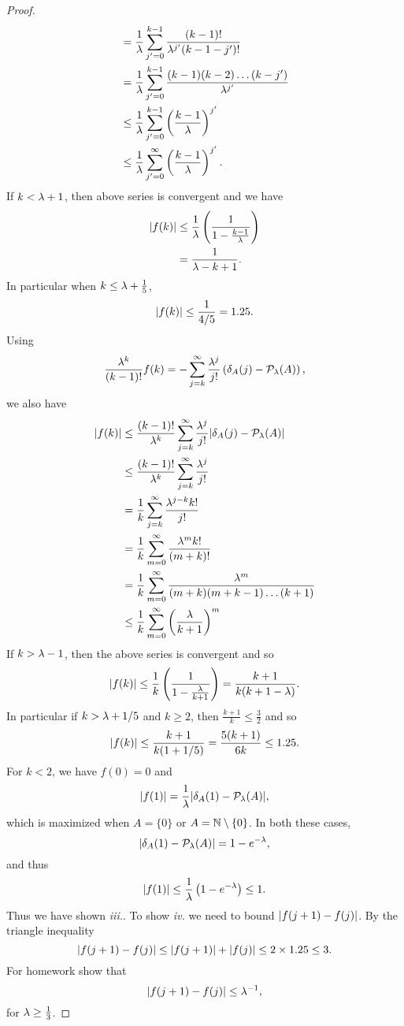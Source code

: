 \begin{proof}
\begin{align*}
        &=\frac{1}{\lambda}\sum_{j'=0}^{k-1} \frac{(k-1)!}{\lambda^{j'}(k-1-j')!}\\
        &=\frac{1}{\lambda}\sum_{j'=0}^{k-1} \frac{(k-1)(k-2)\ldots(k-j')}{\lambda^{j'}}\\
        &\le \frac{1}{\lambda}\sum_{j'=0}^{k-1}\left(\frac{k-1}{\lambda}\right)^{j'}\\
        &\le \frac{1}{\lambda}\sum_{j'=0}^{\infty}\left(\frac{k-1}{\lambda}\right)^{j'}.
    \end{align*}
    If $k < \lambda+1$, then above series is convergent and we have 
    \begin{align*}
        {\left\lvert f(k)\right\rvert}&\le\frac{1}{\lambda}\left(\frac{1}{1-\frac{k-1}{\lambda}}\right)\\
        &=\frac{1}{\lambda-k+1}. 
    \end{align*}
    In particular when $k \le \lambda + \frac{1}{5}$,
    \[{\left\lvert f(k)\right\rvert} \le \frac{1}{4/5} = 1.25. \]
    Using 
    \[\frac{\lambda^k}{(k-1)!}f(k) = -\sum_{j=k}^\infty \frac{\lambda^j}{j!}\left(\delta_A(j)-{\mathcal{P}}_\lambda(A)\right), \]
    we also have
    \begin{align*}
        {\left\lvert f(k)\right\rvert} &\le \frac{(k-1)!}{\lambda^k} \sum_{j=k}^\infty \frac{\lambda^j}{j!}{\left\lvert\delta_A(j)-{\mathcal{P}}_\lambda(A)\right\rvert}\\
        &\le \frac{(k-1)!}{\lambda^k}\sum_{j=k}^\infty \frac{\lambda^j}{j!}\\
        &=\frac{1}{k}\sum_{j=k}^\infty \frac{\lambda^{j-k}k!}{j!}\\
        &=\frac{1}{k}\sum_{m=0}^\infty \frac{\lambda^{m}k!}{(m+k)!}\\
        &=\frac{1}{k}\sum_{m=0}^\infty \frac{\lambda^{m}}{(m+k)(m+k-1)\ldots (k+1)}\\
        &\le \frac{1}{k}\sum_{m=0}^\infty \left(\frac{\lambda}{k+1}\right)^m
    \end{align*}
    If $k > \lambda -1$, then the above series is convergent and so
    \[{\left\lvert f(k)\right\rvert} \le \frac{1}{k}\left(\frac{1}{1-\frac{\lambda}{k+1}}\right) = \frac{k+1}{k(k+1-\lambda)}. \] 
    In particular if $k > \lambda + 1/5$ and $k \ge 2$, then $\frac{k+1}{k} \le \frac{3}{2}$ and so  
    \[{\left\lvert f(k)\right\rvert} \le \frac{k+1}{k(1+1/5)} = \frac{5(k+1)}{6k} \le 1.25. \]
    For $k < 2$, we have $f(0)=0$ and 
    \[{\left\lvert f(1)\right\rvert} = \frac{1}{\lambda}{\left\lvert\delta_A(1)-{\mathcal{P}}_\lambda(A)\right\rvert}, \]
    which is maximized when $A = \{0\}$ or $A = {{\mathbb N}} \setminus \{0\}$. In both these cases,
    \[{\left\lvert\delta_A(1)-{\mathcal{P}}_\lambda(A)\right\rvert} = 1-e^{-\lambda}, \]
    and thus 
    \[{\left\lvert f(1)\right\rvert} \le \frac{1}{\lambda}\left(
        1-e^{-\lambda}\right) \le 1. \]
        Thus we have shown \emph{iii.}. To show \emph{iv.}  we need to bound ${\left\lvert f(j+1)-f(j)\right\rvert}$. 
        By the triangle inequality
        \[{\left\lvert f(j+1)-f(j)\right\rvert} \le {\left\lvert f(j+1)\right\rvert}+{\left\lvert f(j)\right\rvert} \le 2\times 1.25 \le 3. \]
        For homework show that 
        \[{\left\lvert f(j+1)-f(j)\right\rvert} \le \lambda^{-1}, \]
        for $\lambda \ge \frac{1}{3}$.
\end{proof}
